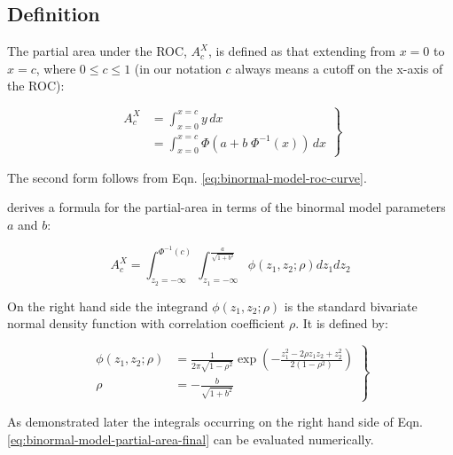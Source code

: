 \documentclass[
]{book}
\begin{document}
\hypertarget{binormal-model-meaning-partial-auc-definitions}{%
\subsection{Definition}\label{binormal-model-meaning-partial-auc-definitions}}

The partial area under the ROC, \(A_c^{X}\), is defined as that extending from \(x = 0\) to \(x = c\), where \(0 \le c \le 1\) (in our notation \(c\) always means a cutoff on the x-axis of the ROC):

\begin{equation} 
\left. 
\begin{aligned}
A_c^{X} &= \int_{x=0}^{x=c} y \, dx 
\\&=  \int_{x=0}^{x=c} \Phi\left ( a + b \; \Phi^{-1} \left ( x \right ) \right ) \, dx 
\end{aligned}
\right \}
\label{eq:binormal-model-partial-area-a1}
\end{equation}

The second form follows from Eqn. \eqref{eq:binormal-model-roc-curve}.

\citep{thompson1989statistical} derives a formula for the partial-area in terms of the binormal model parameters \(a\) and \(b\):

\begin{equation}
A_c^{X} = \int_{z_2=-\infty}^{\Phi^{-1}\left ( c \right )}   \int_{z_1=-\infty}^{\frac{a}{\sqrt{1+b^2}}} \phi\left ( z_1,z_2;\rho \right ) dz_1dz_2
\label{eq:binormal-model-partial-area-final}
\end{equation}

On the right hand side the integrand \(\phi\left ( z_1,z_2;\rho \right )\) is the standard bivariate normal density function with correlation coefficient \(\rho\). It is defined by:

\begin{equation}
\left. 
\begin{aligned}
\phi\left (z_1,z_2;\rho \right ) &= \frac{1}{2 \pi \sqrt{1-\rho^2}} \exp\left ( -\frac{z_1^2 -2\rho z_1 z_2 +z_2^2}{2\left ( 1-\rho^2 \right )} \right ) \\
\rho &= - \frac{b}{\sqrt{1+b^2}}
\end{aligned}
\right \}
\label{eq:binormal-model-bivariate-density}
\end{equation}

As demonstrated later the integrals occurring on the right hand side of Eqn. \eqref{eq:binormal-model-partial-area-final} can be evaluated numerically.
\end{document}
